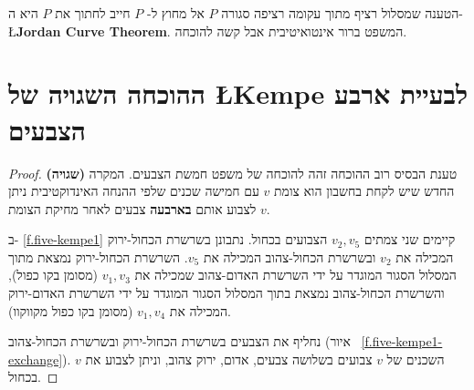 
\begin{advanced}
הטענה שמסלול רציף מתוך עקומה רציפה סגורה 
$P$
אל מחוץ ל-%
$P$
חייב לחתוך את
$P$
היא ה-%
\L{\textbf{Jordan Curve Theorem}}.
המשפט ברור אינטואיטיבית אבל קשה להוכחה.
\end{advanced}


\section{ההוכחה השגויה של
\L{\normalsize Kempe}
לבעיית ארבע הצבעים}
\label{s.kempe}

\begin{proof}
\textbf{(שגויה)}
טענת הבסיס רוב ההוכחה זהה להוכחה של משפט חמשת הצבעים. המקרה החדש שיש לקחת בחשבון הוא צומת 
$v$
עם חמישה שכנים שלפי ההנחה האינדוקטיבית ניתן לצבוע אותם
\textbf{בארבעה}
צבעים לאחר מחיקת הצומת
$v$.

ב-%
\ref{f.five-kempe1}
קיימים שני צמתים
$v_2,v_5$
הצבועים בכחול. נתבונן בשרשרת הכחול-ירוק המכילה את 
$v_2$
ובשרשרת הכחול-צהוב המכילה את
$v_5$.
השרשרת הכחול-ירוק נמצאת מתוך המסלול הסגור המוגדר על ידי השרשרת האדום-צהוב שמכילה את
$v_1,v_3$
(מסומן בקו כפול), והשרשרת הכחול-צהוב נמצאת בתוך המסלול הסגור המוגדר על ידי השרשרת האדום-ירוק המכילה את
$v_1,v_4$
(מסומן בקו כפול מקווקוו).

נחליף את הצבעים בשרשרת הכחול-ירוק ובשרשרת הכחול-צהוב 
(איור%
~\ref{f.five-kempe1-exchange}).
השכנים של
$v$
צבועים בשלושה צבעים, אדום, ירוק צהוב, וניתן לצבוע את
$v$
בכחול.
\end{proof}


